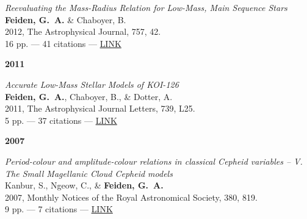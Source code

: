 \documentclass[11pt,a4paper]{article}
\begin{document}
\begin{etaremune}[leftmargin=0.4in]
    \item {\it Reevaluating the Mass-Radius Relation for Low-Mass, Main Sequence Stars} \\
          {\bf Feiden, G.~A.} \& Chaboyer, B. \\ 
          2012, The Astrophysical Journal, 757, 42. \\
          16 pp. --- 41 citations --- \href{http://adsabs.harvard.edu/abs/2012ApJ...757...42F}{LINK}
    
    \item[{\bf 2011}]
    
    \item {\it Accurate Low-Mass Stellar Models of KOI-126} \\
          {\bf Feiden, G.~A.}, Chaboyer, B., \& Dotter, A. \\
          2011, The Astrophysical Journal Letters, 739, L25. \\
          5 pp. --- 37 citations --- \href{http://adsabs.harvard.edu/abs/2011ApJ...740L..25F}{LINK}
          
    \item[{\bf 2007}]
    
    \item {\it Period-colour and amplitude-colour relations in classical Cepheid variables -- V. The Small Magellanic Cloud Cepheid models} \\
          Kanbur, S., Ngeow, C., \& {\bf Feiden, G.~A.} \\
          2007, Monthly Notices of the Royal Astronomical Society, 380, 819. \\ 
          9 pp. --- 7 citations --- \href{http://adsabs.harvard.edu/abs/2007MNRAS.380..819K}{LINK}

\end{etaremune}

\vspace{\baselineskip}

\end{document}
